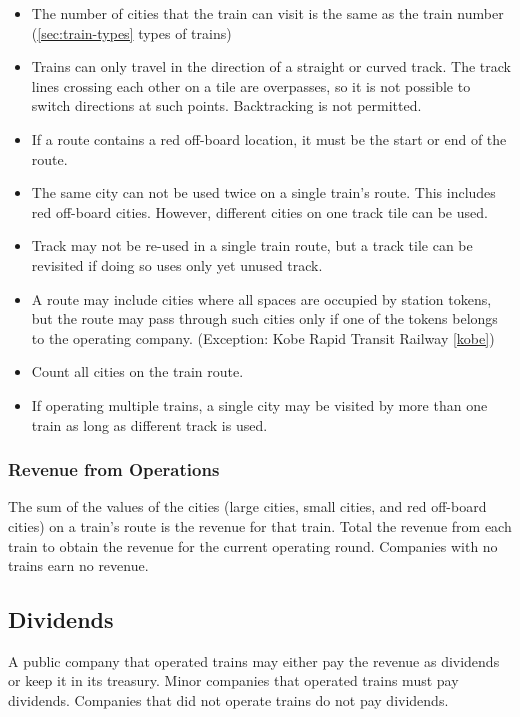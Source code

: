 \documentclass{article}
\begin{document}
\begin{CJK}{UTF8}{min}
\begin{multicols}{2}
\begin{itemize}
\item The number of cities that the train can visit is the same as the
  train number (\autoref{sec:train-types} types of trains)

\item Trains can only travel in the direction of a straight or curved
  track. The track lines crossing each other on a tile are overpasses,
  so it is not possible to switch directions at such
  points. Backtracking is not permitted.

\item If a route contains a red off-board location, it must be the start
  or end of the route.

\item The same city can not be used twice on a single train's
  route. This includes red off-board cities. However, different cities on one
  track tile can be used.

\item Track may not be re-used in a single train route, but a
  track tile can be revisited if doing so uses only yet unused track.

\item A route may include cities where all spaces are occupied by
  station tokens, but the route may pass through such cities only if
  one of the tokens belongs to the operating company. (Exception: Kobe
  Rapid Transit Railway \ref{kobe})

\item Count all cities on the train route.

\item If operating multiple trains, a single city may be visited by
  more than one train as long as different track is used.
\end{itemize}

\subsubsection{Revenue from Operations}
The sum of the values of the cities (large cities, small cities, and
red off-board cities) on a train's route is the revenue for that
train. Total the revenue from each train to obtain the revenue for the
current operating round. Companies with no trains earn no revenue.

\subsection{Dividends}
A public company that operated trains may either pay the revenue as
dividends or keep it in its treasury. Minor companies that operated
trains must pay dividends. Companies that did not operate trains do
not pay dividends.


\end{multicols}
\end{CJK}
\end{document}
